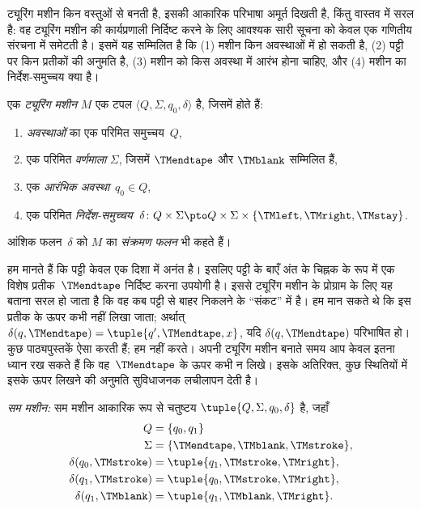 \documentclass[../../../include/open-logic-section]{subfiles}
\begin{document}

\begin{explain}
ट्यूरिंग मशीन किन वस्तुओं से बनती है, इसकी आकारिक परिभाषा अमूर्त दिखती
है, किंतु वास्तव में सरल है: वह ट्यूरिंग मशीन की कार्यप्रणाली निर्दिष्ट
करने के लिए आवश्यक सारी सूचना को केवल एक गणितीय संरचना में समेटती है।
इसमें यह सम्मिलित है कि (1) मशीन किन अवस्थाओं में हो सकती है, (2) पट्टी
पर किन प्रतीकों की अनुमति है, (3) मशीन को किस अवस्था में आरंभ होना चाहिए,
और (4) मशीन का निर्देश-समुच्चय क्या है।
\end{explain}

\begin{defn}[ट्यूरिंग मशीन]
एक \emph{ट्यूरिंग मशीन} $M$ एक टपल $\langle Q, \Sigma, q_0,
\delta\rangle$ है, जिसमें होते हैं:
\begin{enumerate}
\item \emph{अवस्थाओं} का एक परिमित समुच्चय~$Q$,
\item एक परिमित \emph{वर्णमाला} $\Sigma$, जिसमें $\TMendtape$ और
  $\TMblank$ सम्मिलित हैं,
\item एक \emph{आरंभिक अवस्था}~$q_0 \in Q$,
\item एक परिमित \emph{निर्देश-समुच्चय}~$\delta\colon Q \times \Sigma
  \pto Q \times \Sigma \times \{\TMleft, \TMright, \TMstay\}$.
\end{enumerate}
आंशिक फलन~$\delta$ को $M$ का \emph{संक्रमण फलन} भी कहते हैं।
\end{defn}

\begin{explain}
हम मानते हैं कि पट्टी केवल एक दिशा में अनंत है। इसलिए पट्टी के बाएँ अंत
के चिह्नक के रूप में एक विशेष प्रतीक~$\TMendtape$ निर्दिष्ट करना उपयोगी
है। इससे ट्यूरिंग मशीन के प्रोग्राम के लिए यह बताना सरल हो जाता है कि वह
कब पट्टी से बाहर निकलने के ``संकट'' में है। हम मान सकते थे कि इस प्रतीक
के ऊपर कभी नहीं लिखा जाता; अर्थात्
$\delta(q,\TMendtape) = \tuple{q', \TMendtape, x}$, यदि
$\delta(q,\TMendtape)$ परिभाषित हो। कुछ
पाठ्यपुस्तकें ऐसा करती हैं; हम नहीं करते। अपनी ट्यूरिंग मशीन बनाते समय आप
केवल इतना ध्यान रख सकते हैं कि वह~$\TMendtape$ के ऊपर कभी न लिखे। इसके
अतिरिक्त, कुछ स्थितियों में इसके ऊपर लिखने की अनुमति सुविधाजनक लचीलापन
देती है।
\end{explain}

\begin{ex}
\emph{सम मशीन:} सम मशीन आकारिक रूप से चतुष्टय
$\tuple{Q, \Sigma, q_0, \delta}$ है, जहाँ
\begin{align*}
Q & = \{ q_0, q_1 \} \\
\Sigma & = \{ \TMendtape, \TMblank, \TMstroke \}, \\
\delta(q_0, \TMstroke) & = \tuple{q_1, \TMstroke, \TMright},\\
\delta(q_1, \TMstroke) & = \tuple{q_0, \TMstroke, \TMright},\\
\delta(q_1, \TMblank)  & = \tuple{q_1, \TMblank, \TMright}.
\end{align*}
\end{ex}
\end{document}
